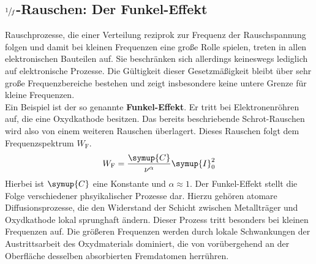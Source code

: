 \subsection{$\sfrac{1}{f}$-Rauschen: Der Funkel-Effekt}

Rauschprozesse, die einer Verteilung reziprok zur Frequenz der Rauschspannung folgen und damit bei kleinen Frequenzen eine große Rolle spielen, treten in allen elektronischen Bauteilen auf. Sie beschränken sich allerdings keineswegs lediglich auf elektronische Prozesse. Die Gültigkeit dieser Gesetzmäßigkeit bleibt über sehr große Frequenzbereiche bestehen und zeigt insbesondere keine untere Grenze für kleine Frequenzen. \\
Ein Beispiel ist der so genannte \textbf{Funkel-Effekt}. Er tritt bei Elektronenröhren auf, die eine Oxydkathode besitzen. Das bereits beschriebende Schrot-Rauschen wird also von einem weiteren Rauschen überlagert. Dieses Rauschen folgt dem Frequenzspektrum $W_\text{F}$.
%
\begin{equation}
  W_\text{F}=\frac{\symup{C}}{\nu^\alpha}\symup{I}_0^2
\end{equation}
%
Hierbei ist $\symup{C}$ eine Konstante und $\alpha\approx1$. Der Funkel-Effekt stellt die Folge verschiedener phsyikalischer Prozesse dar. Hierzu gehören atomare Diffusionsprozesse, die den Widerstand der Schicht zwischen Metallträger und Oxydkathode lokal sprunghaft ändern. Dieser Prozess tritt besonders bei kleinen Frequenzen auf. Die größeren Frequenzen werden durch lokale Schwankungen der Austrittsarbeit des Oxydmaterials dominiert, die von vorübergehend an der Oberfläche desselben absorbierten Fremdatomen herrühren.

